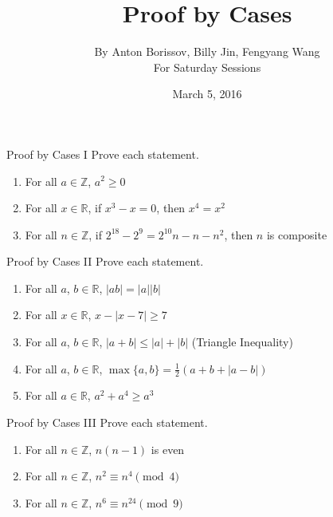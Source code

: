 \documentclass[12pt,letterpaper]{article}
\title{Proof by Cases}
\author{By Anton Borissov, Billy Jin, Fengyang Wang\\
For Saturday Sessions}
\date{March 5, 2016}
\begin{document}
\maketitle

\thispagestyle{empty}

\begin{problem}{Proof by Cases I}
 Prove each statement.

 \begin{enumerate}[\hspace{.5cm}a.]
  \item For all $a\in\mathbb{Z}$, $a^2\ge 0$
  \item For all $x\in\mathbb{R}$, if $x^3-x=0$, then $x^4=x^2$
  \item For all $n\in\mathbb{Z}$, if $2^{18} - 2^9 = 2^{10}n - n - n^2$,
  then $n$ is composite
 \end{enumerate}
\end{problem}

\begin{problem}{Proof by Cases II}
 Prove each statement.

 \begin{enumerate}[\hspace{.5cm}a.]
  \item For all $a$, $b\in\mathbb{R}$,
  $\left|ab\right|=\left|a\right|\left|b\right|$
  \item For all $x\in\mathbb{R}$, $x-\left|x-7\right|\ge7$
  \item For all $a$, $b\in\mathbb{R}$,
  $\left|a+b\right|\le\left|a\right|+\left|b\right|$ \hfill
  (Triangle Inequality)
  \item For all $a$, $b\in\mathbb{R}$, $\max{\{a,b\}} = \frac{1}{2} \left(
  a + b + \left|a-b\right| \right)$
  \item For all $a\in\mathbb{R}$, $a^2+a^4\ge a^3$
 \end{enumerate}
\end{problem}

\begin{problem}{Proof by Cases III}
 Prove each statement.

 \begin{enumerate}[\hspace{.5cm}a.]
  \item For all $n\in\mathbb{Z}$, $n(n-1)$ is even
  \item For all $n\in\mathbb{Z}$, $n^2 \equiv n^4 \pmod{4}$
  \item For all $n\in\mathbb{Z}$, $n^6 \equiv n^{24} \pmod{9}$
 \end{enumerate}
\end{problem}
\end{document}
